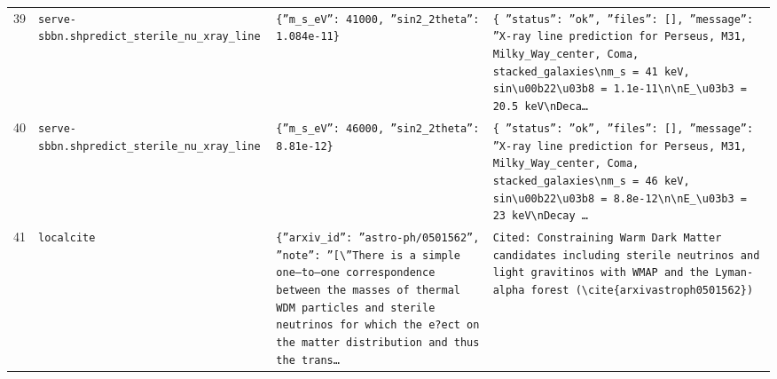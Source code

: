 \documentclass[11pt,a4paper]{article}
\begin{document}
\begin{longtable}{@{}p{}p{}p{}p{}@{}}
39 & \texttt{serve-sbbn.sh}\newline\texttt{predict\_\allowbreak{}sterile\_\allowbreak{}nu\_\allowbreak{}xray\_\allowbreak{}line} & \texttt{\{''m\_\allowbreak{}s\_\allowbreak{}eV'':\allowbreak{} 41000,\allowbreak{} ''sin2\_\allowbreak{}2theta'':\allowbreak{} 1.084e-11\}\allowbreak{}} & \texttt{\{   ''status'':\allowbreak{} ''ok'',\allowbreak{}   ''files'':\allowbreak{} []\allowbreak{},\allowbreak{}   ''message'':\allowbreak{} ''X-ray line prediction for Perseus,\allowbreak{} M31,\allowbreak{} Milky\_\allowbreak{}Way\_\allowbreak{}center,\allowbreak{} Coma,\allowbreak{} stacked\_\allowbreak{}galaxies\textbackslash{}\allowbreak{}nm\_\allowbreak{}s =\allowbreak{} 41 keV,\allowbreak{} sin\textbackslash{}\allowbreak{}u00b22\textbackslash{}\allowbreak{}u03b8 =\allowbreak{} 1.1e-11\textbackslash{}\allowbreak{}n\textbackslash{}\allowbreak{}nE\_\allowbreak{}\textbackslash{}\allowbreak{}u03b3 =\allowbreak{} 20.5 keV\textbackslash{}\allowbreak{}nDeca\ldots{}\allowbreak{}} \\
40 & \texttt{serve-sbbn.sh}\newline\texttt{predict\_\allowbreak{}sterile\_\allowbreak{}nu\_\allowbreak{}xray\_\allowbreak{}line} & \texttt{\{''m\_\allowbreak{}s\_\allowbreak{}eV'':\allowbreak{} 46000,\allowbreak{} ''sin2\_\allowbreak{}2theta'':\allowbreak{} 8.81e-12\}\allowbreak{}} & \texttt{\{   ''status'':\allowbreak{} ''ok'',\allowbreak{}   ''files'':\allowbreak{} []\allowbreak{},\allowbreak{}   ''message'':\allowbreak{} ''X-ray line prediction for Perseus,\allowbreak{} M31,\allowbreak{} Milky\_\allowbreak{}Way\_\allowbreak{}center,\allowbreak{} Coma,\allowbreak{} stacked\_\allowbreak{}galaxies\textbackslash{}\allowbreak{}nm\_\allowbreak{}s =\allowbreak{} 46 keV,\allowbreak{} sin\textbackslash{}\allowbreak{}u00b22\textbackslash{}\allowbreak{}u03b8 =\allowbreak{} 8.8e-12\textbackslash{}\allowbreak{}n\textbackslash{}\allowbreak{}nE\_\allowbreak{}\textbackslash{}\allowbreak{}u03b3 =\allowbreak{} 23 keV\textbackslash{}\allowbreak{}nDecay \ldots{}\allowbreak{}} \\
41 & \texttt{local}\newline\texttt{cite} & \texttt{\{''arxiv\_\allowbreak{}id'':\allowbreak{} ''astro-ph/\allowbreak{}0501562'',\allowbreak{} ''note'':\allowbreak{} ''[\textbackslash{}\allowbreak{}''There is a simple one--to--one correspondence between the masses of thermal WDM particles and sterile neutrinos for which the e?ect on the matter distribution and thus the trans\ldots{}\allowbreak{}} & \texttt{Cited:\allowbreak{} Constraining Warm Dark Matter candidates including sterile neutrinos and light gravitinos with WMAP and the Lyman-alpha forest (\textbackslash{}\allowbreak{}cite\{arxivastroph0501562\}\allowbreak{})\allowbreak{}} \\

\end{longtable}
\end{document}
